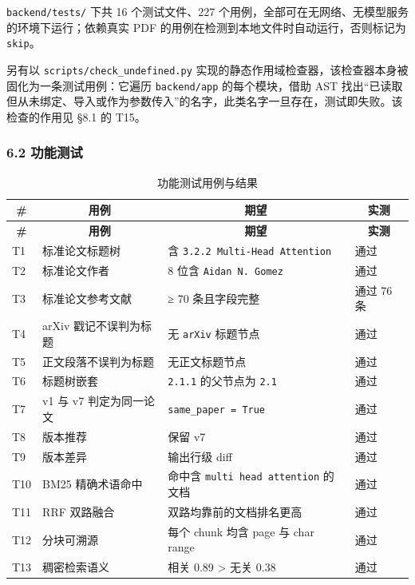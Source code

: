 \documentclass[UTF8,fontset=windows,zihao=5,a4paper]{ctexart}
\begin{document}
\texttt{backend/tests/} 下共 16 个测试文件、227 个用例，全部可在无网络、无模型服务的环境下运行；依赖真实 PDF 的用例在检测到本地文件时自动运行，否则标记为 \texttt{skip}。

另有以 \texttt{scripts/check\_\allowbreak{}undefined.py} 实现的静态作用域检查器，该检查器本身被固化为一条测试用例：它遍历 \texttt{backend/app} 的每个模块，借助 AST 找出“已读取但从未绑定、导入或作为参数传入”的名字，此类名字一旦存在，测试即失败。该检查的作用见 §8.1 的 T15。

\subsubsection*{6.2 功能测试}
\begin{longtable}{@{}p{}p{}p{}p{}@{}}
\caption{功能测试用例与结果}\\
\toprule
\multicolumn{1}{c}{\textbf{\#}} & \multicolumn{1}{c}{\textbf{用例}} & \multicolumn{1}{c}{\textbf{期望}} & \multicolumn{1}{c}{\textbf{实测}} \\
\midrule
\endfirsthead
\toprule
\multicolumn{1}{c}{\textbf{\#}} & \multicolumn{1}{c}{\textbf{用例}} & \multicolumn{1}{c}{\textbf{期望}} & \multicolumn{1}{c}{\textbf{实测}} \\
\midrule
\endhead
\bottomrule
\endfoot
T1 & 标准论文标题树 & 含 \texttt{3.2.2 Multi-Head Attention} & 通过 \\
T2 & 标准论文作者 & 8 位含 \texttt{Aidan N. Gomez} & 通过 \\
T3 & 标准论文参考文献 & ≥ 70 条且字段完整 & 通过 76 条 \\
T4 & arXiv 戳记不误判为标题 & 无 \texttt{arXiv} 标题节点 & 通过 \\
T5 & 正文段落不误判为标题 & 无正文标题节点 & 通过 \\
T6 & 标题树嵌套 & \texttt{2.1.1} 的父节点为 \texttt{2.1} & 通过 \\
T7 & v1 与 v7 判定为同一论文 & \texttt{same\_\allowbreak{}paper = True} & 通过 \\
T8 & 版本推荐 & 保留 v7 & 通过 \\
T9 & 版本差异 & 输出行级 diff & 通过 \\
T10 & BM25 精确术语命中 & 命中含 \texttt{multi head attention} 的文档 & 通过 \\
T11 & RRF 双路融合 & 双路均靠前的文档排名更高 & 通过 \\
T12 & 分块可溯源 & 每个 chunk 均含 page 与 char range & 通过 \\
T13 & 稠密检索语义 & 相关 0.89 > 无关 0.38 & 通过 \\

\end{longtable}
\end{document}
